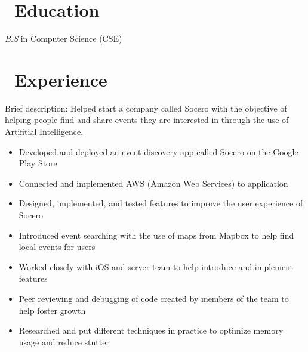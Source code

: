 \documentclass{resume}
\begin{document}



\section{\faGraduationCap\ Education}
\textit{B.S} in Computer Science (CSE)

\section{\faUsers\ Experience}
Brief description: Helped start a company called Socero with the objective of helping people find and share events they are interested in through the use of Artifitial Intelligence.
\begin{itemize}
  \item Developed and deployed an event discovery app called Socero on the Google Play Store
  \item Connected and implemented AWS (Amazon Web Services) to application
  \item Designed, implemented, and tested features to improve the user experience of Socero
  \item Introduced event searching with the use of maps from Mapbox to help find local events for users
  \item Worked closely with iOS and server team to help introduce and implement features
  \item Peer reviewing and debugging of code created by members of the team to help foster growth
  \item Researched and put different techniques in practice to optimize memory usage and reduce stutter
\end{itemize}

\end{document}
